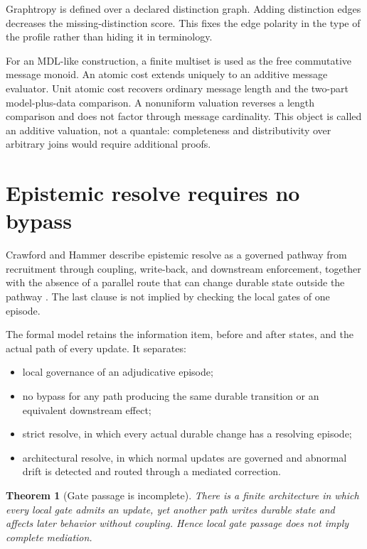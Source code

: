 \documentclass[11pt]{article}
\newtheorem{theorem}[definition]{Theorem}
\theoremstyle{remark}
\begin{document}
Graphtropy is defined over a declared distinction graph.  Adding distinction
edges decreases the missing-distinction score.  This fixes the edge polarity
in the type of the profile rather than hiding it in terminology.

For an MDL-like construction, a finite multiset is used as the free
commutative message monoid.  An atomic cost extends uniquely to an additive
message evaluator.  Unit atomic cost recovers ordinary message length and the
two-part model-plus-data comparison.  A nonuniform valuation reverses a length
comparison and does not factor through message cardinality.  This object is
called an additive valuation, not a quantale: completeness and distributivity
over arbitrary joins would require additional proofs.

\section{Epistemic resolve requires no bypass}

Crawford and Hammer describe epistemic resolve as a governed pathway from
recruitment through coupling, write-back, and downstream enforcement, together
with the absence of a parallel route that can change durable state outside the
pathway \cite{crawfordhammer2026}.  The last clause is not implied by checking
the local gates of one episode.

The formal model retains the information item, before and after states, and the
actual path of every update.  It separates:

\begin{itemize}
  \item local governance of an adjudicative episode;
  \item no bypass for any path producing the same durable transition or an
        equivalent downstream effect;
  \item strict resolve, in which every actual durable change has a resolving
        episode;
  \item architectural resolve, in which normal updates are governed and
        abnormal drift is detected and routed through a mediated correction.
\end{itemize}

\begin{theorem}[Gate passage is incomplete]
There is a finite architecture in which every local gate admits an update, yet
another path writes durable state and affects later behavior without coupling.
Hence local gate passage does not imply complete mediation.
\end{theorem}
\end{document}
